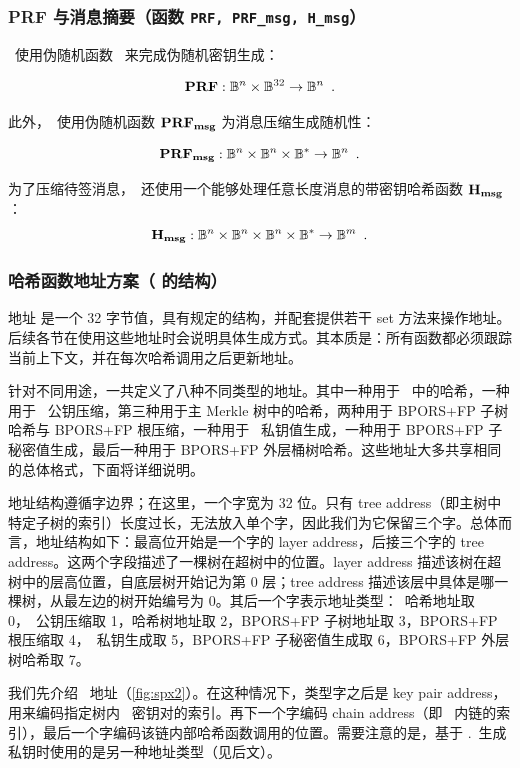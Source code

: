 \subsubsection{PRF 与消息摘要（函数 \texttt{PRF, PRF\_msg, H\_msg}）}

\SPHINCSA\ 使用伪随机函数 \PRF\ 来完成伪随机密钥生成：

\[\mathbf{PRF} : \mathbb{B}^{n}\times \mathbb{B}^{32}\rightarrow \mathbb{B}^{n} \enspace.\]

此外，\SPHINCSA\ 使用伪随机函数 $\mathbf{PRF_{msg}}$ 为消息压缩生成随机性：

\[\mathbf{PRF_{msg}} : \mathbb{B}^{n}\times \mathbb{B}^{n}\times \mathbb{B}^{*}\rightarrow \mathbb{B}^{n} \enspace.\]

为了压缩待签消息，\SPHINCSA\ 还使用一个能够处理任意长度消息的带密钥哈希函数 $\mathbf{H_{msg}}$：
\[ \mathbf{H_{msg}} : \mathbb{B}^{n}\times \mathbb{B}^{n}\times \mathbb{B}^{n}\times \mathbb{B}^{*}\rightarrow \mathbb{B}^{m} \enspace.\]

\subsubsection{哈希函数地址方案（{\ADRS} 的结构）} \label{sec:addr}

地址 \ADRS 是一个 32 字节值，具有规定的结构，并配套提供若干 set 方法来操作地址。后续各节在使用这些地址时会说明具体生成方式。其本质是：所有函数都必须跟踪当前上下文，并在每次哈希调用之后更新地址。

针对不同用途，一共定义了八种不同类型的地址。其中一种用于 \WOTSCS\ 中的哈希，一种用于 \WOTSCS\ 公钥压缩，第三种用于主 Merkle 树中的哈希，两种用于 BPORS+FP 子树哈希与 BPORS+FP 根压缩，一种用于 \WOTSCS\ 私钥值生成，一种用于 BPORS+FP 子秘密值生成，最后一种用于 BPORS+FP 外层桶树哈希。这些地址大多共享相同的总体格式，下面将详细说明。

地址结构遵循字边界；在这里，一个字宽为 32 位。只有 tree address（即主树中特定子树的索引）长度过长，无法放入单个字，因此我们为它保留三个字。总体而言，地址结构如下：最高位开始是一个字的 layer address，后接三个字的 tree address。这两个字段描述了一棵树在超树中的位置。layer address 描述该树在超树中的层高位置，自底层树开始记为第 0 层；tree address 描述该层中具体是哪一棵树，从最左边的树开始编号为 0。其后一个字表示地址类型：\WOTSCS\ 哈希地址取 0，\WOTSCS\ 公钥压缩取 1，哈希树地址取 2，BPORS+FP 子树地址取 3，BPORS+FP 根压缩取 4，\WOTSCS\ 私钥生成取 5，BPORS+FP 子秘密值生成取 6，BPORS+FP 外层树哈希取 7。

我们先介绍 \WOTSCS\ 地址（\cref{fig:spx2}）。在这种情况下，类型字之后是 key pair address，用来编码指定树内 \WOTSCS\ 密钥对的索引。再下一个字编码 chain address（即 \WOTSCS\ 内链的索引），最后一个字编码该链内部哈希函数调用的位置。需要注意的是，基于 \sk.\seed\ 生成私钥时使用的是另一种地址类型（见后文）。


